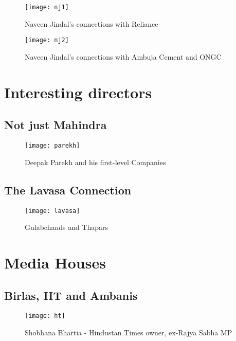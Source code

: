 \begin{figure}[H]
\begin{center}  
\texttt{[image: nj1]} 
\caption{Naveen Jindal's connections with Reliance}
\label{fig:nj1}
\end{center}
\end{figure}

\begin{figure}[H]
\begin{center}  
\texttt{[image: nj2]} 
\caption{Naveen Jindal's connections with Ambuja Cement and ONGC}
\label{fig:nj2}
\end{center}
\end{figure}


\section{Interesting directors}

\subsection{Not just Mahindra}
\begin{figure}[H]
\begin{center}  
\texttt{[image: parekh]} 
\caption{Deepak Parekh and his first-level Companies}
\label{fig:parekh}
\end{center}
\end{figure}


\subsection{The Lavasa Connection}
\begin{figure}[H]
\begin{center}  
\texttt{[image: lavasa]} 
\caption{Gulabchands and Thapars}
\label{fig:lavasa}
\end{center}
\end{figure}


\section{Media Houses}

\subsection{Birlas, HT and Ambanis}

\begin{figure}[H]
\begin{center}  
\texttt{[image: ht]} 
\caption{Shobhana Bhartia - Hindustan Times owner, ex-Rajya Sabha MP}
\label{fig:ht}
\end{center}
\end{figure}


